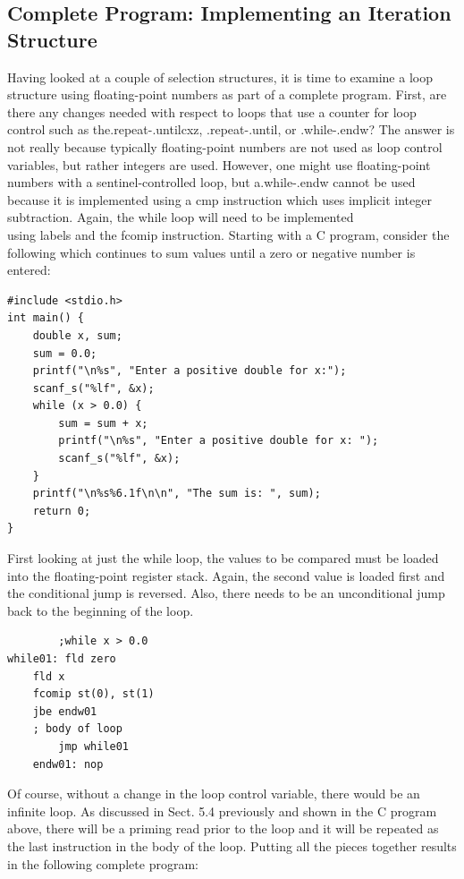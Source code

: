 \documentclass[10pt]{book}
\begin{document}
\subsection{Complete Program: Implementing an Iteration Structure}
Having looked at a couple of selection structures, it is time to examine a loop structure using floating-point numbers as part of a complete program. First, are there any changes needed with respect to loops that use a counter for loop control such as the.repeat-.untilcxz, .repeat-.until, or .while-.endw? The answer is not really because typically floating-point numbers are not used as loop control variables, but rather integers are used. However, one might use floating-point numbers with a sentinel-controlled loop, but a.while-.endw cannot be used because it is implemented using a cmp instruction which uses implicit integer subtraction. Again, the while loop will need to be implemented\\
using labels and the fcomip instruction. Starting with a C program, consider the following which continues to sum values until a zero or negative number is entered:


\begin{verbatim}
#include <stdio.h>
int main() {
    double x, sum;
    sum = 0.0;
    printf("\n%s", "Enter a positive double for x:");
    scanf_s("%lf", &x);
    while (x > 0.0) {
        sum = sum + x;
        printf("\n%s", "Enter a positive double for x: ");
        scanf_s("%lf", &x);
    }
    printf("\n%s%6.1f\n\n", "The sum is: ", sum);
    return 0;
}
\end{verbatim}

First looking at just the while loop, the values to be compared must be loaded into the floating-point register stack. Again, the second value is loaded first and the conditional jump is reversed. Also, there needs to be an unconditional jump back to the beginning of the loop.

\begin{verbatim}
        ;while x > 0.0
while01: fld zero
    fld x
    fcomip st(0), st(1)
    jbe endw01
    ; body of loop
        jmp while01
    endw01: nop
\end{verbatim}

Of course, without a change in the loop control variable, there would be an infinite loop. As discussed in Sect. 5.4 previously and shown in the C program above, there will be a priming read prior to the loop and it will be repeated as the last instruction in the body of the loop. Putting all the pieces together results in the following complete program:
\end{document}

